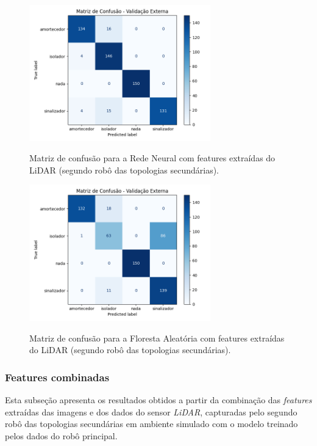 \begin{figure}[H]
\centering
\caption{Matriz de confusão para a Rede Neural com features extraídas do LiDAR (segundo robô das topologias secundárias).}
\includegraphics[width=0.7\textwidth]{figuras/Resultados/multi_segundo_Teste4_nn.png}
\label{fig:mc_featlidar_nn_robo2_t4}
\fonte{}
\end{figure}

\begin{figure}[H]
\centering
\caption{Matriz de confusão para a Floresta Aleatória com features extraídas do LiDAR (segundo robô das topologias secundárias).}
\includegraphics[width=0.7\textwidth]{figuras/Resultados/multi_segundo_Teste4_rf.png}
\label{fig:mc_featlidar_rf_robo2_t4}
\fonte{}
\end{figure}

\subsubsection{Features combinadas}

Esta subseção apresenta os resultados obtidos a partir da combinação das \textit{features}
extraídas das imagens e dos dados do sensor \textit{LiDAR}, capturadas pelo segundo robô das topologias secundárias em ambiente simulado com o modelo treinado pelos dados do robô principal.

